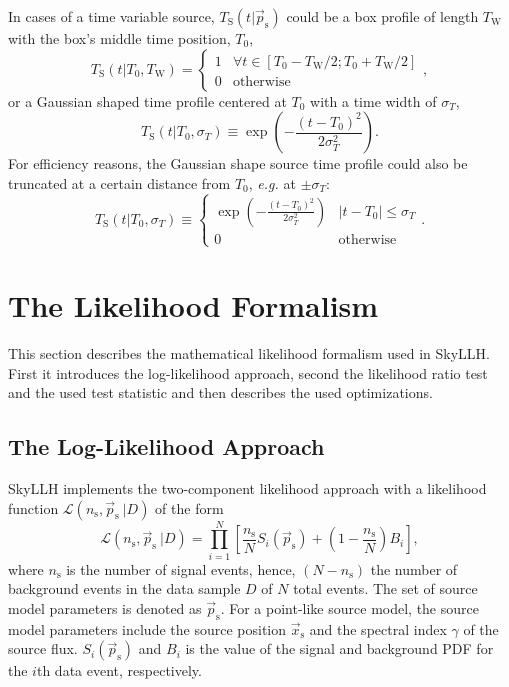 \documentclass{article}
\newcommand{\ns}{n_{\mathrm{s}}}
\newcommand{\ps}{\vec{p}_{\mathrm{s}}}
\newcommand{\xs}{\vec{x}_{\mathrm{s}}}
\begin{document}
In cases of a time variable source, $T_{\mathrm{S}}(t|\ps)$ could be a box
profile of length $T_{\mathrm{W}}$ with the box's middle time position, $T_{0}$,
\begin{equation}
 T_{\mathrm{S}}(t|T_0,T_{\mathrm{W}}) =
   \begin{cases}
     1 & \forall t \in \left[T_0 - T_{\mathrm{W}}/2; T_0 + T_{\mathrm{W}}/2 \right]\\
     0 & \mathrm{otherwise}
   \end{cases},
 \label{eq:Ts-box}
\end{equation}
or a Gaussian shaped time profile centered at $T_0$ with a time width of $\sigma_T$,
\begin{equation}
 T_{\mathrm{S}}(t|T_0,\sigma_T) \equiv \exp\left(-\frac{(t - T_0)^2}{2\sigma_T^2}\right).
 \label{eq:Ts-gauss-non-truncated}
\end{equation}
For efficiency reasons, the Gaussian shape source time profile could also be
truncated at a certain distance from $T_0$, \emph{e.g.} at $\pm\sigma_T$:
\begin{equation}
 T_{\mathrm{S}}(t|T_0,\sigma_T) \equiv
   \begin{cases}
     \exp\left(-\frac{(t - T_0)^2}{2\sigma_T^2}\right) & \left|t-T_0\right| \le \sigma_T\\
     0 & \mathrm{otherwise}
   \end{cases}.
 \label{eq:Ts-gauss-truncated}
\end{equation}


\section{The Likelihood Formalism}

This section describes the mathematical likelihood formalism used in SkyLLH.
First it introduces the log-likelihood approach, second the likelihood ratio
test and the used test statistic and then describes the used optimizations.

\subsection{The Log-Likelihood Approach}

SkyLLH implements the two-component likelihood approach with a likelihood
function $\mathcal{L}(n_{\mathrm{s}},\vec{p}_{\mathrm{s}}~|D)$ of the form
\begin{equation}
 \mathcal{L}(\ns,\ps~|D) = \prod_{i=1}^{N}\left[ \frac{\ns}{N} S_{i}(\ps) + (1 - \frac{\ns}{N}) B_{i} \right],
\label{eq:L}
\end{equation}
where $\ns$ is the number of signal events, hence, $(N-\ns)$ the number of
background events in the data sample $D$ of $N$ total events.
The set of source model parameters is denoted as $\ps$. For a point-like source
model, the source model parameters include the source position $\xs$ and the
spectral index $\gamma$ of the source flux.
$S_i(\ps)$ and $B_i$ is the value of the signal and background PDF for the $i$th
data event, respectively.
\end{document}
